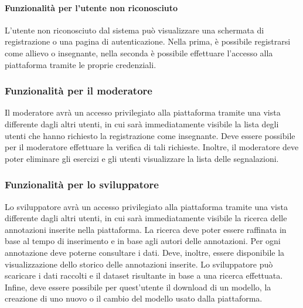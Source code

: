 	\paragraph{Funzionalità per l'utente non riconosciuto\\}
	L'utente non riconosciuto dal sistema può visualizzare una schermata di registrazione o una pagina di autenticazione. Nella prima, è possibile registrarsi come allievo o insegnante, nella seconda è possibile effettuare l'accesso alla piattaforma tramite le proprie credenziali.
	
	\subsubsection{Funzionalità per il moderatore}
	Il moderatore avrà un accesso privilegiato alla piattaforma tramite una vista differente dagli altri utenti, in cui sarà immediatamente visibile la lista degli utenti che hanno richiesto la registrazione come insegnante. Deve essere possibile per il moderatore effettuare la verifica di tali richieste. Inoltre, il moderatore deve poter eliminare gli esercizi e gli utenti visualizzare la lista delle segnalazioni.
	
	\subsubsection{Funzionalità per lo sviluppatore}
	Lo sviluppatore avrà un accesso privilegiato alla piattaforma tramite una vista differente dagli altri utenti, in cui sarà immediatamente visibile la ricerca delle annotazioni inserite nella piattaforma. La ricerca deve poter essere raffinata in base al tempo di inserimento e in base agli autori delle annotazioni. Per ogni annotazione deve poterne consultare i dati. Deve, inoltre, essere disponibile la visualizzazione dello storico delle annotazioni inserite. Lo sviluppatore può scaricare i dati raccolti e il dataset risultante in base a una ricerca effettuata. Infine, deve essere possibile per quest'utente il download di un modello, la creazione di uno nuovo o il cambio del modello usato dalla piattaforma.